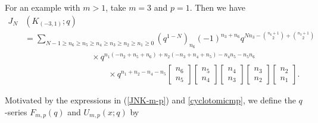 \documentclass[11pt,reqno]{amsart}
\theoremstyle{definition}
\numberwithin{equation}{section}
\begin{document}
\noindent For an example with $m > 1$, take $m=3$ and $p=1$.    Then we have
\begin{equation}
\begin{aligned}
J_N&(K_{(-3,1)};q)  \\
&= \sum_{N-1 \geq n_6 \geq n_5 \geq n_4 \geq n_3 \geq n_2 \geq n_1 \geq 0} (q^{1-N})_{n_6}(-1)^{n_3+n_6}q^{Nn_3 -\binom{n_6+1}{2} + \binom{n_3+1}{2}} \\
&\qquad \qquad \qquad \qquad \times q^{n_1(-n_2 + n_5+n_6) + n_2(-n_3+n_4+n_5)  - n_4n_5 - n_5n_6} \\
& \qquad \qquad \qquad \qquad \qquad \times q^{n_1 +n_2 - n_4 -n_5} \begin{bmatrix} n_6 \\ n_5 \end{bmatrix} \begin{bmatrix} n_5 \\ n_4 \end{bmatrix} \begin{bmatrix} n_4 \\ n_3\end{bmatrix}  \begin{bmatrix} n_3 \\ n_2 \end{bmatrix} \begin{bmatrix} n_2 \\ n_1 \end{bmatrix}.
\end{aligned}
\end{equation}

Motivated by the expressions in (\ref{JNK-m-p}) and \eqref{cyclotomicmp}, we define the $q$-series $F_{m,p}(q)$ and $U_{m,p}(x;q)$ by
\end{document}
